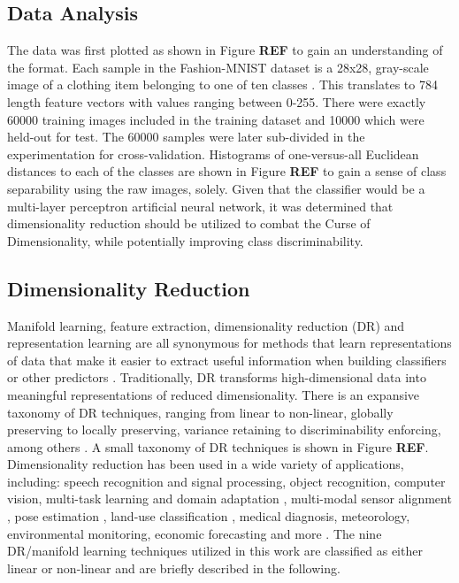 \documentclass[conference]{IEEEtran}
\begin{document}
	\subsection{Data Analysis}
	The data was first plotted as shown in Figure \textbf{REF} to gain an understanding of the format.  Each sample in the Fashion-MNIST dataset is a 28x28, gray-scale image of a clothing item belonging to one of ten classes \cite{Xiao2017FashionMNIST}. This translates to 784 length feature vectors with values ranging between 0-255. There were exactly 60000 training images included in the  training dataset and 10000 which were held-out for test.  The 60000 samples were later sub-divided in the experimentation for cross-validation. Histograms of one-versus-all Euclidean distances to each of the classes are shown in Figure \textbf{REF} to gain a sense of class separability using the raw images, solely.  Given that the classifier would be a multi-layer perceptron artificial neural network, it was determined that dimensionality reduction should be utilized to combat the Curse of Dimensionality, while potentially improving class discriminability.
	
	\subsection{Dimensionality Reduction}
	Manifold learning, feature extraction, dimensionality reduction (DR) and representation learning are all synonymous for methods that learn representations of data that make it easier to extract useful information when building classifiers or other predictors \cite{Bengio2014RepLearningReview}. Traditionally, DR transforms high-dimensional data into meaningful representations of reduced dimensionality.  There is an expansive taxonomy of DR techniques, ranging from linear to non-linear, globally preserving to locally preserving, variance retaining to discriminability enforcing, among others \cite{VanDerMaaten2009DRReview}.  A small taxonomy of DR techniques is shown in Figure \textbf{REF}.   Dimensionality reduction has been used in a wide variety  of applications, including: speech recognition and signal processing, object recognition, computer vision, multi-task learning and domain adaptation \cite{Bengio2014RepLearningReview}, multi-modal sensor alignment \cite{zhang2010multisourceremotingsensingfusion,Davenport2010JointManifoldsDataFusion}, pose estimation \cite{Navaratnam2007JointManifoldSemiSupRegression}, land-use classification \cite{Hong2019LearnableManifoldAlignment}, medical diagnosis, meteorology, environmental monitoring, economic forecasting and more \cite{Zitova2003SurveyImageRegistrationMethods}.  The nine DR/manifold learning techniques utilized in this work are classified as either linear or non-linear and are briefly described in the following.
	
\end{document}

